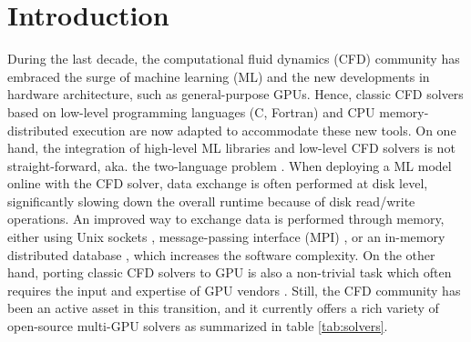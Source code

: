\documentclass[final,3p,times]{elsarticle}
\begin{document}
\section{Introduction}

During the last decade, the computational fluid dynamics (CFD) community has embraced the surge of machine learning (ML) and the new developments in hardware architecture, such as general-purpose GPUs. Hence, classic CFD solvers based on low-level programming languages (C, Fortran) and CPU memory-distributed execution are now adapted to accommodate these new tools. On one hand, the integration of high-level ML libraries and low-level CFD solvers is not straight-forward, aka. the two-language problem \cite{Churavy2022}. When deploying a ML model online with the CFD solver, data exchange is often performed at disk level, significantly slowing down the overall runtime because of disk read/write operations. An improved way to exchange data is performed through memory, either using Unix sockets \cite{Rabault2019, Font2021}, message-passing interface (MPI) \cite{Guastoni2023}, or an in-memory distributed database \cite{Kurz2022,Font2024}, which increases the software complexity. On the other hand, porting classic CFD solvers to GPU is also a non-trivial task which often requires the input and expertise of GPU vendors \cite{Romero2022}. Still, the CFD community has been an active asset in this transition, and it currently offers a rich variety of open-source multi-GPU solvers as summarized in table \ref{tab:solvers}.
\end{document}
